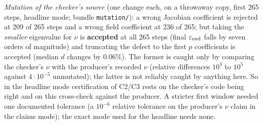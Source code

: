 \documentclass[11pt]{article}
\begin{document}
\emph{Mutation of the checker's source} (one change each, on a throwaway copy, first 265 steps, headline mode; bundle \texttt{mutation/}): a wrong Jacobian coefficient is rejected at 209 of 265 steps and a wrong field coefficient at 236 of 265;
but taking the \emph{smaller} eigenvalue for $\nu$ is \textbf{accepted} at all 265 steps (final $\varepsilon_{\rm end}$ falls by seven orders of magnitude) and truncating the defect to the first $p$ coefficients is accepted (median $d$ changes by $0.06\%$).
The former is caught only by comparing the checker's $\nu$ with the producer's recorded $\nu$ (relative differences $10^3$ to $10^5$ against $4\cdot10^{-5}$ unmutated); the latter is not reliably caught by anything here. So in the headline mode certification of C2/C3 rests on the checker's code being right and on this cross-check against the producer.
A stricter first window needed one documented tolerance (a $10^{-6}$ relative tolerance on the producer's $\nu$ claim in the claims mode); the exact mode used for the headline needs none.
\end{document}
